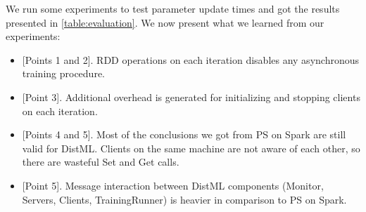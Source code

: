 We run some experiments to test parameter update times and got the results presented in \autoref{table:evaluation}. We now present what we learned from our experiments:
\begin{itemize}
  \item {[}Points 1 and 2{]}. RDD operations on each iteration disables any asynchronous training procedure.
  \item {[}Point 3{]}. Additional overhead is generated for initializing and stopping clients on each iteration.
  \item {[}Points 4 and 5{]}. Most of the conclusions we got from PS on Spark are still valid for DistML. Clients on the same machine are not aware of each other, so there are wasteful Set and Get calls.
  \item {[}Point 5{]}. Message interaction between DistML components (Monitor, Servers, Clients, TrainingRunner) is heavier in comparison to PS on Spark.
\end{itemize}

